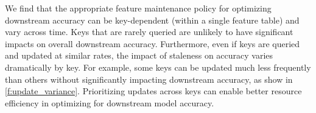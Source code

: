 
We find that the appropriate feature maintenance 
policy for optimizing downstream accuracy can be key-dependent (within a single feature table) and vary across time.
Keys that are rarely queried are unlikely to have significant impacts on overall downstream accuracy. 
Furthermore, even if keys are queried and updated at similar rates, the impact of staleness on accuracy varies dramatically by key. For example, some keys can be updated much less frequently than others without significantly impacting downstream accuracy, as show in \cref{f:update_variance}.
 Prioritizing updates across keys can enable better resource efficiency in optimizing for downstream model accuracy. 







